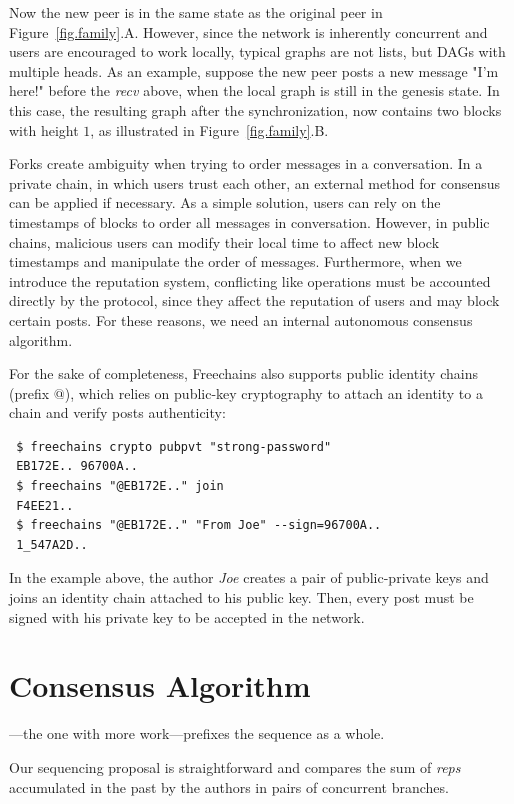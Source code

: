 \documentclass[10pt,journal,compsoc]{IEEEtran}
\newcommand{\FC} {Freechains\xspace}
\begin{document}
Now the new peer is in the same state as the original peer in
Figure~\ref{fig.family}.A.
However, since the network is inherently concurrent and users are encouraged to
work locally, typical graphs are not lists, but DAGs with multiple heads.
As an example, suppose the new peer posts a new message "I'm here!" before the
\emph{recv} above, when the local graph is still in the genesis state.
In this case, the resulting graph after the synchronization, now contains two
blocks with height $1$, as illustrated in Figure~\ref{fig.family}.B.

Forks create ambiguity when trying to order messages in a conversation.
In a private chain, in which users trust each other, an external method for
consensus can be applied if necessary.
As a simple solution, users can rely on the timestamps of blocks to order all
messages in conversation.
However, in public chains, malicious users can modify their local time to
affect new block timestamps and manipulate the order of messages.
Furthermore, when we introduce the reputation system, conflicting like
operations must be accounted directly by the protocol, since they affect the
reputation of users and may block certain posts.
For these reasons, we need an internal autonomous consensus algorithm.

For the sake of completeness, \FC also supports public identity chains (prefix
$@$), which relies on public-key cryptography to attach an identity to a chain
and verify posts authenticity:

{\footnotesize
\begin{verbatim}
 $ freechains crypto pubpvt "strong-password"
 EB172E.. 96700A..
 $ freechains "@EB172E.." join
 F4EE21..
 $ freechains "@EB172E.." "From Joe" --sign=96700A..
 1_547A2D..
\end{verbatim}
}

In the example above, the author \emph{Joe} creates a pair of public-private
keys and joins an identity chain attached to his public key.
Then, every post must be signed with his private key to be accepted in the
network.

\section{Consensus Algorithm}
\label{sec.consensus}

\newpage

---the one with more work---prefixes the
sequence as a whole.

Our sequencing proposal is straightforward and compares the sum of \emph{reps}
accumulated in the past by the authors in pairs of concurrent branches.
\end{document}
